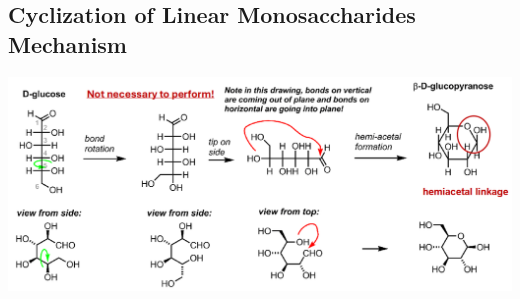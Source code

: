 \documentclass[10pt]{article}
\begin{document}
\subsection*{Cyclization of Linear Monosaccharides Mechanism}
\begin{center}
    \includegraphics*[width=\textwidth]{L1_9.png}
\end{center}
\end{document}

